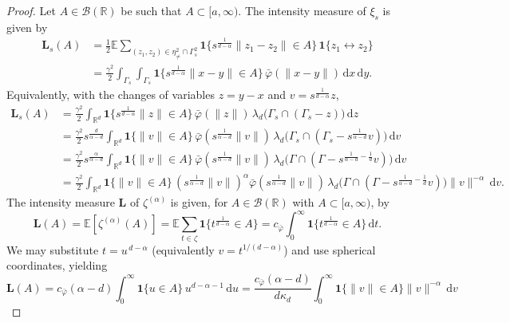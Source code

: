 \documentclass{article}
\theoremstyle{definition}
\numberwithin{equation}{section}
\theoremstyle{remark}
\newcommand{\E}{\mathbb{E}}
\newcommand{\R}{\mathbb{R}}
\begin{document}
\begin{proof}
Let $A\in\mathcal{B}(\mathbb{R})$ be such that $A\subset[a,\infty)$. The intensity measure of $\xi_s$ is given by
\begin{align*}
\mathbf{L}_s(A)
& = \frac{1}{2}\E \sum_{(z_1,z_2)\in\eta^2_{\neq}\cap\Gamma_s^2}
\mathbf{1}\Big\{s^{\frac{1}{d-\alpha}}\|z_1-z_2\|\in A\Big\}\,
\mathbf{1}\{z_1\leftrightarrow z_2\} \\
&= \frac{\gamma^2}{2}\int_{\Gamma_s}\int_{\Gamma_s}
\mathbf{1}\Big\{s^{\frac{1}{d-\alpha}}\|x-y\|\in A\Big\}\,
\bar\varphi(\|x-y\|)\,\mathrm{d}x\,\mathrm{d}y.
\end{align*}
Equivalently, with the changes of variables $z=y-x$ and $v=s^{\frac{1}{d-\alpha}}z$,
\begin{align*}
\mathbf{L}_s(A)
& = \frac{\gamma^2}{2}\int_{\R^d}
\mathbf{1}\Big\{s^{\frac{1}{d-\alpha}}\|z\|\in A\Big\}\,
\bar\varphi(\|z\|)\,
\lambda_d\big(\Gamma_s\cap(\Gamma_s-z)\big)\,\mathrm{d}z \\
& = \frac{\gamma^2}{2} s^{\frac{d}{\alpha-d}} \int_{\R^d}
\mathbf{1}\Big\{\|v\|\in A\Big\}\,
\bar\varphi(s^{\frac{1}{\alpha-d}}\|v\|)\,
\lambda_d\big(\Gamma_s\cap(\Gamma_s-s^{\frac{1}{\alpha-d}}v)\big)\,\mathrm{d}v\\
& = \frac{\gamma^2}{2} s^{\frac{\alpha}{\alpha-d}} \int_{\R^d}
\mathbf{1}\Big\{\|v\|\in A\Big\}\,
\bar\varphi(s^{\frac{1}{\alpha-d}}\|v\|)\,
\lambda_d\big(\Gamma\cap(\Gamma-s^{\frac{1}{\alpha-d}-\frac{1}{d}}v)\big)\,\mathrm{d}v \\
& = \frac{\gamma^2}{2} \int_{\R^d}
\mathbf{1}\Big\{\|v\|\in A\Big\}\, (s^{\frac{1}{\alpha-d}}\|v\|)^\alpha
\bar\varphi(s^{\frac{1}{\alpha-d}}\|v\|)\,
\lambda_d\big(\Gamma\cap(\Gamma-s^{\frac{1}{\alpha-d}-\frac{1}{d}}v)\big) \|v\|^{-\alpha}\,\mathrm{d}v.
\end{align*}
The intensity measure $\mathbf{L}$ of $\zeta^{(\alpha)}$ is given, for $A\in\mathcal{B}(\R)$ with $A\subset[a,\infty)$, by
\[
\mathbf{L}(A) =  \E[\zeta^{(\alpha)}(A)]
= \E\sum_{t\in\zeta}\mathbf{1}\Big\{t^{\frac{1}{d-\alpha}}\in A\Big\}
= c_{\bar\varphi}\int_0^\infty \mathbf{1}\Big\{t^{\frac{1}{d-\alpha}}\in A\Big\}\,\mathrm{d}t.
\]
We may substitute $t=u^{\,d-\alpha}$ (equivalently $v=t^{1/(d-\alpha)}$) and use spherical coordinates, yielding
\[
\mathbf{L}(A)
= c_{\bar\varphi}(\alpha-d)\int_0^\infty \mathbf{1}\{u\in A\}\,u^{d-\alpha-1}\,\mathrm{d}u = \frac{c_{\bar\varphi}(\alpha-d)}{d\kappa_d}\int_0^\infty \mathbf{1}\{\|v\|\in A\} \|v\|^{-\alpha} \,\mathrm{d}v
\]

\end{proof}
\end{document}

